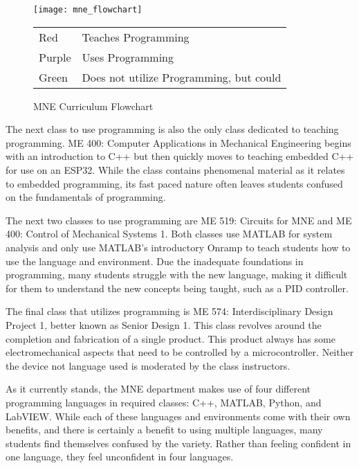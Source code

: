 \begin{figure}[h]
    \texttt{[image: mne\_flowchart]}
    \begin{tabular}{l@{ : }l}
        Red & Teaches Programming \\
        Purple & Uses Programming \\
        Green & Does not utilize Programming, but could \\
    \end{tabular}
    \centering
    \caption{MNE Curriculum Flowchart}
    \centering
    \label{fig:mne_flowchart}
\end{figure}

The next class to use programming is also the only class dedicated to teaching programming.
ME 400: Computer Applications in Mechanical Engineering begins with an introduction to C++
but then quickly moves to teaching embedded C++ for use on an ESP32. While the class
contains phenomenal material as it relates to embedded programming, its fast paced nature
often leaves students confused on the fundamentals of programming. 

The next two classes to use programming are ME 519: Circuits for MNE and ME 400:
Control of Mechanical Systems 1. Both classes use MATLAB for system analysis and only use
MATLAB's introductory Onramp to teach students how to use the language and environment.
Due the inadequate foundations in programming, many students struggle with the new language,
making it difficult for them to understand the new concepts being taught, such as a PID
controller.


The final class that utilizes programming is ME 574: Interdisciplinary Design Project 1, 
better known as Senior Design 1. This class revolves around the completion and fabrication
of a single product. This product always has some electromechanical aspects that need to
be controlled by a microcontroller. Neither the device not language used is moderated by
the class instructors.

As it currently stands, the MNE department makes use of four different programming languages
in required classes: C++, MATLAB, Python, and LabVIEW. While each of these languages and 
environments come with their own benefits, and there is certainly a benefit to using 
multiple languages, many students find themselves confused by the variety. Rather than
feeling confident in one language, they feel unconfident in four languages.

